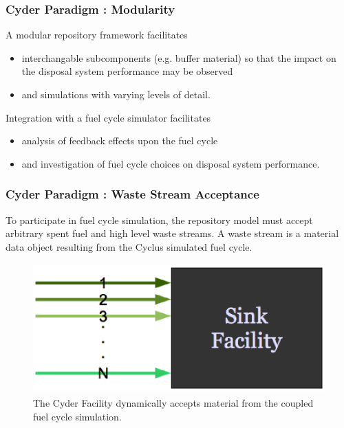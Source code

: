 
\begin{frame}[ctb!]
  \frametitle{Cyder Paradigm : Modularity }
  A modular repository framework facilitates 
  \begin{itemize}
    \item  interchangable subcomponents (e.g. buffer material) so that 
      the impact on the disposal system performance may be observed
    \item and simulations with varying levels of detail.
  \end{itemize}
 \pause
  Integration with a fuel cycle simulator facilitates
  \begin{itemize}
    \item analysis of feedback effects upon the fuel cycle
    \item and investigation of fuel cycle choices on disposal system 
      performance.
  \end{itemize}
\end{frame}


\begin{frame}[ctb!]
  \frametitle{Cyder Paradigm : Waste Stream Acceptance}
  \footnotesize{
  
To participate in fuel cycle simulation, the repository model must accept arbitrary 
spent fuel and high level waste streams. A waste stream is a material data 
object resulting from the Cyclus simulated fuel cycle.  
  \begin{figure}[htbp!]
    \begin{center}
      \includegraphics[height=5cm]{./images/sinkfacility.eps}
    \end{center}
    \caption{ The Cyder Facility dynamically accepts material from the 
    coupled fuel cycle simulation.} 
    \label{fig:sinkfacility}
  \end{figure}
}
\end{frame}

